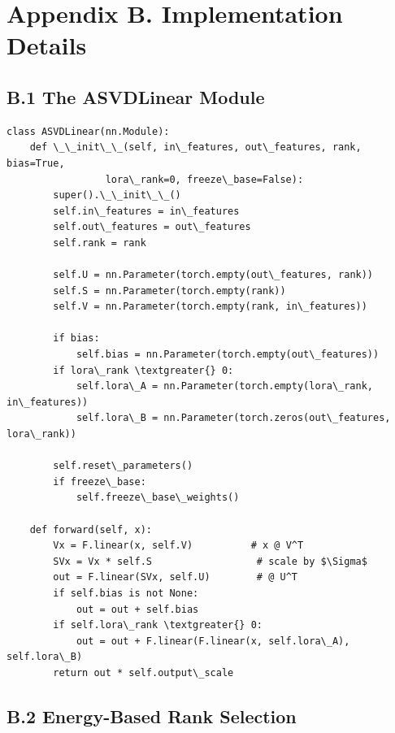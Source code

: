 
\section{Appendix B. Implementation Details}

\subsection{B.1 The ASVDLinear Module}

\begin{lstlisting}
class ASVDLinear(nn.Module):
    def \_\_init\_\_(self, in\_features, out\_features, rank, bias=True,
                 lora\_rank=0, freeze\_base=False):
        super().\_\_init\_\_()
        self.in\_features = in\_features
        self.out\_features = out\_features
        self.rank = rank
        
        self.U = nn.Parameter(torch.empty(out\_features, rank))
        self.S = nn.Parameter(torch.empty(rank))
        self.V = nn.Parameter(torch.empty(rank, in\_features))
        
        if bias:
            self.bias = nn.Parameter(torch.empty(out\_features))
        if lora\_rank \textgreater{} 0:
            self.lora\_A = nn.Parameter(torch.empty(lora\_rank, in\_features))
            self.lora\_B = nn.Parameter(torch.zeros(out\_features, lora\_rank))
        
        self.reset\_parameters()
        if freeze\_base:
            self.freeze\_base\_weights()
    
    def forward(self, x):
        Vx = F.linear(x, self.V)          # x @ V^T
        SVx = Vx * self.S                  # scale by $\Sigma$
        out = F.linear(SVx, self.U)        # @ U^T
        if self.bias is not None:
            out = out + self.bias
        if self.lora\_rank \textgreater{} 0:
            out = out + F.linear(F.linear(x, self.lora\_A), self.lora\_B)
        return out * self.output\_scale
\end{lstlisting}

\subsection{B.2 Energy-Based Rank Selection}

